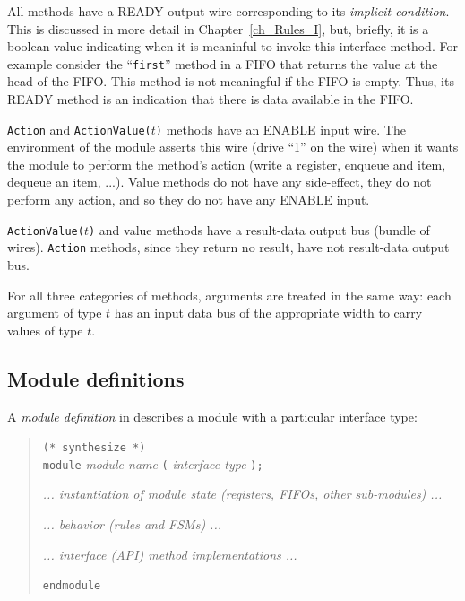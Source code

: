 All methods have a READY output wire corresponding to its
\emph{implicit condition}.  This is discussed in more detail in
Chapter~\ref{ch_Rules_I}, but, briefly, it is a boolean value
indicating when it is meaninful to invoke this interface method.  For
example consider the ``\verb|first|'' method in a FIFO that returns
the value at the head of the FIFO.  This method is not meaningful if
the FIFO is empty.  Thus, its READY method is an indication that there
is data available in the FIFO.

{\tt Action} and {\tt ActionValue($t$)} methods have an ENABLE input
wire.  The environment of the module asserts this wire (drive ``1'' on
the wire) when it wants the module to perform the method's action
(write a register, enqueue and item, dequeue an item, ...).  Value
methods do not have any side-effect, {\ie} they do not perform any
action, and so they do not have any ENABLE input.

{\tt ActionValue($t$)} and value methods have a result-data output bus
(bundle of wires).  {\tt Action} methods, since they return no result,
have not result-data output bus.

For all three categories of methods, arguments are treated in the same
way: each argument of type $t$ has an input data bus of the
appropriate width to carry values of type $t$.


\subsection{Module definitions}

\label{Sec_Module_Definitions}


A \emph{module definition} in {\BSV} describes a module with a particular
interface type:

\begin{quote}
{\tt (* synthesize *)} \\
{\tt module} \emph{module-name} {\tt (} \emph{interface-type} {\tt );}

\hmm \emph{... instantiation of module state (registers, FIFOs, other sub-modules) ...}

\hmm \emph{... behavior (rules and FSMs) ...}

\hmm \emph{... interface (API) method implementations ...}

{\tt endmodule}
\end{quote}

